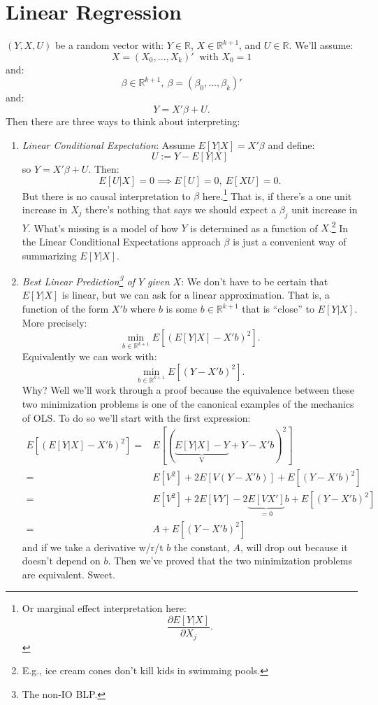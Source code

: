 \documentclass{tufte-book}
\theoremstyle{mytheoremstyle}
\theoremstyle{mylemstyle}
\theoremstyle{mydefstyle}
\begin{document}
\chapter{Linear Regression}
 \((Y, X, U)\) be a random vector with: \(Y \in \mathbb{R}\), \(X \in \mathbb{R}^{k+1}\), and \(U \in \mathbb{R}\). We'll assume:
	\[X = (X_0, \dots, X_k)'\ \text{ with } X_0 = 1\]
and:
	\[\beta \in \mathbb{R}^{k+1},\ \beta = (\beta_0, \dots, \beta_k)'\]
and:
	\[Y = X' \beta + U \text{.}\]
Then there are three ways to think about interpreting:
\begin{enumerate}
\item \emph{Linear Conditional Expectation}: Assume \(E[Y | X] = X'\beta\) and define:
	\[U := Y - E[Y | X]\]
so \(Y = X'\beta + U\). Then:
	\[E[U|X] = 0 \implies E[U] = 0,\ E[XU] = 0 \text{.}\]
But there is no causal interpretation to \(\beta\) here.\footnote{Or marginal effect interpretation here: \[\frac{\partial E[Y|X]}{\partial X_j}\text{.}\]} That is, if there's a one unit increase in \(X_j\) there's nothing that says we should expect a \(\beta_j\) unit increase in \(Y\). What's missing is a model of how \(Y\) is determined as a function of \(X\).\footnote{E.g., ice cream cones don't kill kids in swimming pools.} In the Linear Conditional Expectations approach \(\beta\) is just a convenient way of summarizing \(E[Y|X]\).  

\item \emph{Best Linear Prediction\footnote{The non-IO BLP.} of \(Y\) given \(X\)}: We don't have to be certain that \(E[Y|X]\) is linear, but we can ask for a linear approximation. That is, a function of the form \(X'b\) where \(b\) is some \(b \in \mathbb{R}^{k+1}\) that is ``close'' to \(E[Y|X]\). More precisely:
	\[\min_{b \in \mathbb{R}^{k+1}} E\left[(E[Y|X] - X'b)^2\right] \text{.}\]
Equivalently we can work with:
	\[\min_{b \in \mathbb{R}^{k+1}} E\left[(Y - X'b)^2\right] \text{.}\]
Why? Well we'll work through a proof because the equivalence between these two minimization problems is one of the canonical examples of the mechanics of OLS. To do so we'll start with the first expression: 
	\begin{align*}
		E\left[(E[Y|X] - X'b)^2\right] = & E\left[(\underbrace{E[Y|X] - Y}_\textrm{V} + Y - X'b)^2\right]\\
							= & E[V^2] + 2E[V(Y-X'b)] + E[(Y - X'b)^2] \\
							= & E[V^2] + 2E[VY] -2\underbrace{E[VX']}_\textrm{\(=0\)}b + E[(Y - X'b)^2] \\
							= & A + E[(Y - X'b)^2]\	
	\end{align*}
and if we take a derivative w/r/t \(b\) the constant, \(A\), will drop out because it doesn't depend on \(b\). Then we've proved that the two minimization problems are equivalent. Sweet.


\end{enumerate}
\end{document}
